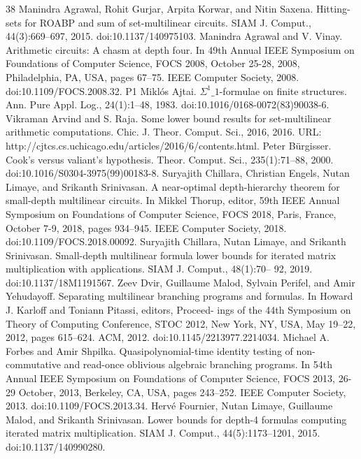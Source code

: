 \begin{thebibliography}{38}
 Manindra Agrawal, Rohit Gurjar, Arpita Korwar, and Nitin Saxena. Hitting-sets for ROABP and sum of set-multilinear circuits. SIAM J. Comput., 44(3):669–697, 2015. doi:10.1137/140975103.
 Manindra Agrawal and V. Vinay. Arithmetic circuits: A chasm at depth four. In 49th Annual IEEE Symposium on Foundations of Computer Science, FOCS 2008, October 25-28, 2008, Philadelphia, PA, USA, pages 67–75. IEEE Computer Society, 2008. doi:10.1109/FOCS.2008.32. P1
 Miklós Ajtai. $\Sigma^1\_1$-formulae on finite structures. Ann. Pure Appl. Log., 24(1):1–48, 1983. doi:10.1016/0168-0072(83)90038-6.
 Vikraman Arvind and S. Raja. Some lower bound results for set-multilinear arithmetic computations. Chic. J. Theor. Comput. Sci., 2016, 2016. URL: http://cjtcs.cs.uchicago.edu/articles/2016/6/contents.html.
 Peter Bürgisser. Cook’s versus valiant’s hypothesis. Theor. Comput. Sci., 235(1):71–88, 2000. doi:10.1016/S0304-3975(99)00183-8.
 Suryajith Chillara, Christian Engels, Nutan Limaye, and Srikanth Srinivasan. A near-optimal depth-hierarchy theorem for small-depth multilinear circuits. In Mikkel Thorup, editor, 59th IEEE Annual Symposium on Foundations of Computer Science, FOCS 2018, Paris, France, October 7-9, 2018, pages 934–945. IEEE Computer Society, 2018. doi:10.1109/FOCS.2018.00092.
 Suryajith Chillara, Nutan Limaye, and Srikanth Srinivasan. Small-depth multilinear formula lower bounds for iterated matrix multiplication with applications. SIAM J. Comput., 48(1):70– 92, 2019. doi:10.1137/18M1191567.
 Zeev Dvir, Guillaume Malod, Sylvain Perifel, and Amir Yehudayoff. Separating multilinear branching programs and formulas. In Howard J. Karloff and Toniann Pitassi, editors, Proceed- ings of the 44th Symposium on Theory of Computing Conference, STOC 2012, New York, NY, USA, May 19–22, 2012, pages 615–624. ACM, 2012. doi:10.1145/2213977.2214034.
 Michael A. Forbes and Amir Shpilka. Quasipolynomial-time identity testing of non- commutative and read-once oblivious algebraic branching programs. In 54th Annual IEEE Symposium on Foundations of Computer Science, FOCS 2013, 26-29 October, 2013, Berkeley, CA, USA, pages 243–252. IEEE Computer Society, 2013. doi:10.1109/FOCS.2013.34.
 Hervé Fournier, Nutan Limaye, Guillaume Malod, and Srikanth Srinivasan. Lower bounds for depth-4 formulas computing iterated matrix multiplication. SIAM J. Comput., 44(5):1173–1201, 2015. doi:10.1137/140990280.

\end{thebibliography}
